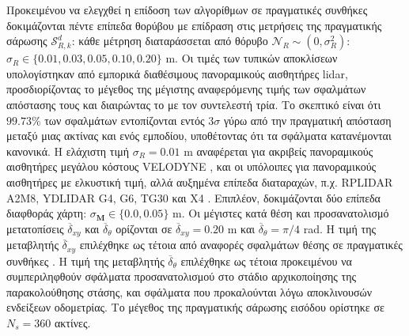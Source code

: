 Προκειμένου να ελεγχθεί η επίδοση των αλγορίθμων σε πραγματικές συνθήκες
δοκιμάζονται πέντε επίπεδα θορύβου με επίδραση στις μετρήσεις της πραγματικής
σάρωσης $\mathcal{S}_{R,k}^d$: κάθε μέτρηση διαταράσσεται από θόρυβο
$\mathcal{N}_{R} \sim (0, \sigma_{R}^2)$: $\sigma_R \in \{0.01, 0.03, 0.05,
0.10, 0.20\}$ m. Οι τιμές των τυπικών αποκλίσεων υπολογίστηκαν από εμπορικά
διαθέσιμους πανοραμικούς αισθητήρες lidar, προσδιορίζοντας το μέγεθος της
μέγιστης αναφερόμενης τιμής των σφαλμάτων απόστασης τους και διαιρώντας το με
τον συντελεστή τρία. Το σκεπτικό είναι ότι $99.73\%$ των σφαλμάτων εντοπίζονται
εντός $3\sigma$ γύρω από την πραγματική απόσταση μεταξύ μιας ακτίνας και ενός
εμποδίου, υποθέτοντας ότι τα σφάλματα κατανέμονται κανονικά. Η ελάχιστη τιμή
$\sigma_R = 0.01$ m αναφέρεται για ακριβείς πανοραμικούς αισθητήρες μεγάλου
κόστους VELODYNE \cite{velodyne_datasheet}, και οι υπόλοιπες για πανοραμικούς
αισθητήρες με ελκυστική τιμή, αλλά αυξημένα επίπεδα διαταραχών, π.χ. RPLIDAR
A2M8, YDLIDAR G4, G6, TG30 και X4 \cite{a2m8_datasheet,ydlidar}. Επιπλέον,
δοκιμάζονται δύο επίπεδα διαφθοράς χάρτη: $\sigma_{\bm{M}} \in \{0.0, 0.05\}$
m.  Οι μέγιστες κατά θέση και προσανατολισμό μετατοπίσεις
$\overline{\delta}_{xy}$ και $\overline{\delta}_{\theta}$ ορίζονται σε
$\overline{\delta}_{xy} = 0.20$ m και $\overline{\delta}_\theta = \pi / 4$ rad.
Η τιμή της μεταβλητής $\overline{\delta}_{xy}$ επιλέχθηκε ως τέτοια από
αναφορές σφαλμάτων θέσης σε πραγματικές συνθήκες \cite{Peng2018a}. Η τιμή της
μεταβλητής $\overline{\delta}_\theta$ επιλέχθηκε ως τέτοια προκειμένου να
συμπεριληφθούν σφάλματα προσανατολισμού στο στάδιο αρχικοποίησης της
παρακολούθησης στάσης, και σφάλματα που προκαλούνται λόγω αποκλινουσών
ενδείξεων οδομετρίας. Το μέγεθος της πραγματικής σάρωσης εισόδου ορίστηκε σε
$N_s=360$ ακτίνες.

